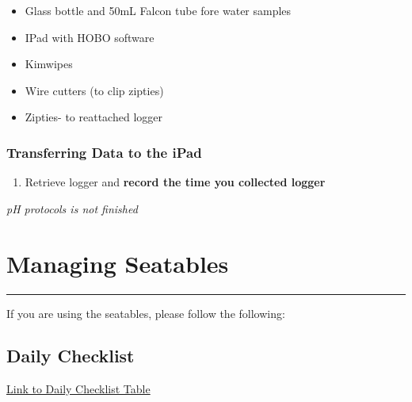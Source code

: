 \documentclass[
  letterpaper,
  DIV=11,
  numbers=noendperiod]{scrreprt}
\providecommand{\tightlist}{%
  \setlength{\itemsep}{0pt}\setlength{\parskip}{0pt}}\usepackage{longtable,booktabs,array}
\begin{document}
\begin{itemize}
\item
  Glass bottle and 50mL Falcon tube fore water samples
\item
  IPad with HOBO software
\item
  Kimwipes
\item
  Wire cutters (to clip zipties)
\item
  Zipties- to reattached logger
\end{itemize}

\hypertarget{transferring-data-to-the-ipad}{%
\subsection*{\texorpdfstring{\textbf{Transferring Data to the
iPad}}{Transferring Data to the iPad}}\label{transferring-data-to-the-ipad}}

\begin{enumerate}
\def\labelenumi{\arabic{enumi}.}
\tightlist
\item
  Retrieve logger and \textbf{record the time you collected logger}
\end{enumerate}

\emph{pH protocols is not finished}

\hypertarget{managing-seatables}{%
\chapter{Managing Seatables}\label{managing-seatables}}

\begin{center}\rule{0.5\linewidth}{0.5pt}\end{center}

If you are using the seatables, please follow the following:

\hypertarget{daily-checklist}{%
\section*{\texorpdfstring{\textbf{Daily
Checklist}}{Daily Checklist}}\label{daily-checklist}}

\href{https://docs.google.com/spreadsheets/d/1oQnhrPk-GJYOvP48skjc4ehimgx4G3M1Ne0vrJx371c/edit\#gid=0}{Link
to Daily Checklist Table}
\end{document}
